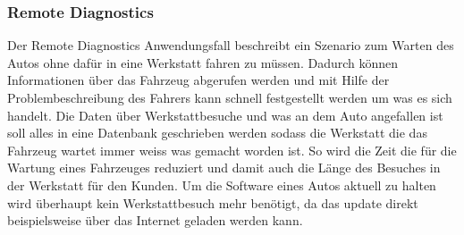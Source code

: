 \subsubsection{Remote Diagnostics}
Der Remote Diagnostics Anwendungsfall beschreibt ein Szenario zum Warten des Autos ohne dafür in eine Werkstatt fahren zu müssen. Dadurch können Informationen über das Fahrzeug abgerufen werden und mit Hilfe der Problembeschreibung des Fahrers kann schnell festgestellt werden um was es sich handelt. Die Daten über Werkstattbesuche und was an dem Auto angefallen ist soll alles in eine Datenbank geschrieben werden sodass die Werkstatt die das Fahrzeug wartet immer weiss was gemacht worden ist. So wird die Zeit die für die Wartung eines Fahrzeuges reduziert und damit auch die Länge des Besuches in der Werkstatt für den Kunden. Um die Software eines Autos aktuell zu halten wird überhaupt kein Werkstattbesuch mehr benötigt, da das update direkt beispielsweise über das Internet geladen werden kann.